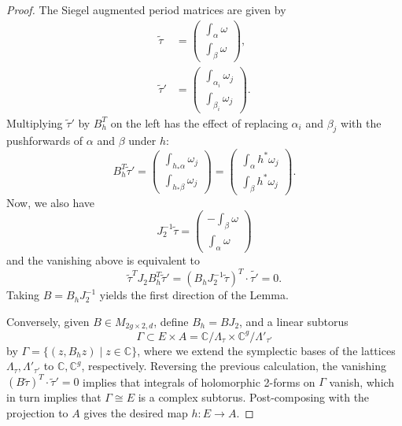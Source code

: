\documentclass[10pt,a4paper]{amsart}
\def\bC{\mathbb{C}}
\begin{document}
\begin{proof}
The Siegel augmented period matrices are given by
\begin{align*}
    \tilde{\tau} &= \begin{pmatrix} \int_\alpha \omega \\ \int_\beta \omega  \end{pmatrix},\\
    \tilde{\tau}' &= \begin{pmatrix} \int_{\alpha_i} \omega_j \\ \int_{\beta_i} \omega_j  \end{pmatrix}.
\end{align*}
Multiplying $\tilde{\tau}'$ by $B_h^T$ on the left has the effect of replacing $\alpha_i$ and $\beta_j$ with the pushforwards of $\alpha$ and $\beta$ under $h$:
\begin{equation*}
B_h^T \tilde{\tau}' = 
\begin{pmatrix} 
\int_{h_*\alpha} \omega_j \\ 
\int_{h_*\beta} \omega_j  \end{pmatrix} 
=
\begin{pmatrix} 
\int_{\alpha} h^*\omega_j \\ 
\int_{\beta} h^*\omega_j 
\end{pmatrix}
.
\end{equation*}
Now, we also have
\begin{equation*}
J_2^{-1}\tilde{\tau} 
=
\begin{pmatrix}
- \int_\beta \omega \\ 
\int_\alpha \omega 
\end{pmatrix}
\end{equation*}
and the vanishing above is equivalent to 
\begin{equation*}
    \tilde{\tau}^T J_2 B_h^T \tilde{\tau}'= (B_hJ_2^{-1}\tilde{\tau})^T\cdot \tilde{\tau'} =0.
\end{equation*}
Taking $B=B_hJ_2^{-1}$ yields the first direction of the Lemma.

Conversely, given $B\in M_{2g\times 2,d}$, define $B_h=BJ_2$, and a linear subtorus 
\begin{equation*}
    \Gamma\subset E\times A=\bC/\Lambda_\tau\times \bC^g/\Lambda'_{\tau'}
\end{equation*}
by $\Gamma=\{(z,B_hz)\mid z\in\bC\}$, where we extend the symplectic bases of the lattices $\Lambda_\tau,\Lambda'_{\tau'}$ to $\bC,\bC^g$, respectively. Reversing the previous calculation, the vanishing $(B \tilde{\tau})^T\cdot \tilde{\tau}'=0$ implies that integrals of holomorphic 2-forms on $\Gamma$ vanish, which in turn implies that $\Gamma\cong E$ is a complex subtorus. Post-composing with the projection to $A$ gives the desired map $h:E\to A$.
\end{proof}
\end{document}

